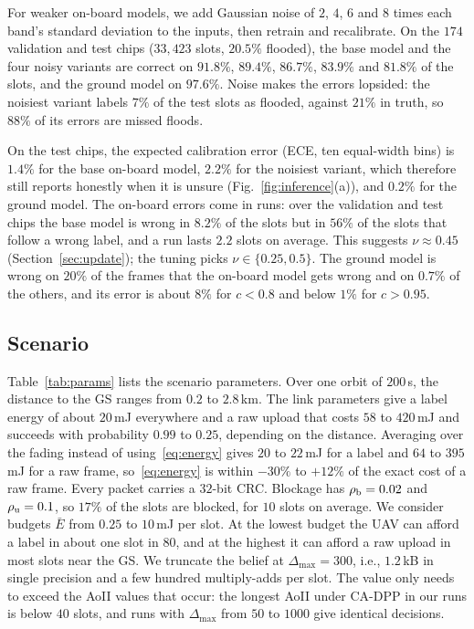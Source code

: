 \documentclass[journal]{IEEEtran}
\theoremstyle{remark}
\begin{document}
For weaker on-board models, we add Gaussian noise of $2$, $4$, $6$ and $8$ times each band's standard deviation to the inputs, then retrain and recalibrate. On the $174$ validation and test chips ($33{,}423$ slots, $20.5\%$ flooded), the base model and the four noisy variants are correct on $91.8\%$, $89.4\%$, $86.7\%$, $83.9\%$ and $81.8\%$ of the slots, and the ground model on $97.6\%$. Noise makes the errors lopsided: the noisiest variant labels $7\%$ of the test slots as flooded, against $21\%$ in truth, so $88\%$ of its errors are missed floods.

On the test chips, the expected calibration error (ECE, ten equal-width bins) is $1.4\%$ for the base on-board model, $2.2\%$ for the noisiest variant, which therefore still reports honestly when it is unsure (Fig.~\ref{fig:inference}(a)), and $0.2\%$ for the ground model. The on-board errors come in runs: over the validation and test chips the base model is wrong in $8.2\%$ of the slots but in $56\%$ of the slots that follow a wrong label, and a run lasts $2.2$ slots on average. This suggests $\nu\approx0.45$ (Section~\ref{sec:update}); the tuning picks $\nu\in\{0.25,0.5\}$. The ground model is wrong on $20\%$ of the frames that the on-board model gets wrong and on $0.7\%$ of the others, and its error is about $8\%$ for $c<0.8$ and below $1\%$ for $c>0.95$.

\subsection{Scenario}
Table~\ref{tab:params} lists the scenario parameters. Over one orbit of $200$\,s, the distance to the GS ranges from $0.2$ to $2.8$\,km. The link parameters give a label energy of about $20$\,mJ everywhere and a raw upload that costs $58$ to $420$\,mJ and succeeds with probability $0.99$ to $0.25$, depending on the distance. Averaging over the fading instead of using~\eqref{eq:energy} gives $20$ to $22$\,mJ for a label and $64$ to $395$\,mJ for a raw frame, so~\eqref{eq:energy} is within $-30\%$ to $+12\%$ of the exact cost of a raw frame. Every packet carries a $32$-bit CRC. Blockage has $\rho_{\rm b}=0.02$ and $\rho_{\rm u}=0.1$, so $17\%$ of the slots are blocked, for $10$ slots on average. We consider budgets $\bar E$ from $0.25$ to $10$\,mJ per slot. At the lowest budget the UAV can afford a label in about one slot in $80$, and at the highest it can afford a raw upload in most slots near the GS. We truncate the belief at $\Delta_{\max}=300$, i.e., $1.2$\,kB in single precision and a few hundred multiply-adds per slot. The value only needs to exceed the AoII values that occur: the longest AoII under CA-DPP in our runs is below $40$ slots, and runs with $\Delta_{\max}$ from $50$ to $1000$ give identical decisions.
\end{document}
